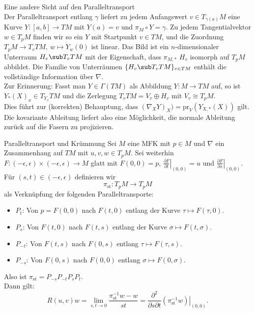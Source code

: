 \begin{bemerkung}Eine andere Sicht auf den Paralleltransport\\
Der Paralleltransport entlang $\gamma$ liefert zu jedem Anfangswert $v \in T_{\gamma(a)}M$ eine Kurve $Y: [a,b] \to TM$ mit $Y(a) = v$ und $\pi_M \circ Y = \gamma$. Zu jedem Tangentialvektor $w \in T_pM$ finden wir so ein $Y$ mit Startpunkt $v \in TM$, und die Zuordnung $T_pM \to T_v TM, \ w \mapsto \dot{Y}_w (0)$ ist linear. Das Bild ist ein $n$-dimensionaler Unterraum $H_v \sub T_v TM$ mit der Eigenschaft, dass $\pi_{M, \ast}$ $H_v$ isomorph auf $T_pM$ abbildet. Die Familie von Unterräumen $\{H_v \sub T_v TM \}_{v \in TM}$ enthält die vollständige Information über $\nabla$.\\
Zur Erinnerung: Fasst man $Y \in \Gamma(TM)$ als Abbildung $Y: M \to TM$ auf, so ist $Y_\ast (X)_x \in T_{Y_x} TM$ und die Zerlegung $T_v TM = V_v \oplus H_v$ mit $V_v \cong T_pM$.\\
Dies führt zur (korrekten) Behauptung, dass $(\nabla_X Y)_X ) = \text{pr}_V (Y_{X, \ast} (X))$ gilt. Die kovariante Ableitung liefert also eine Möglichkeit, die normale Ableitung zurück auf die Fasern zu projizieren.
\end{bemerkung}
\begin{satz}{Paralleltransport und Krümmung}
Sei $M$ eine MFK mit $p \in M$ und $\nabla$ ein Zusammenhang auf $TM$ mit $u,v,w  \in T_pM$. Sei weiterhin $F: (-\epsilon, \epsilon) \times (-\epsilon, \epsilon) \to M$ glatt mit $F(0,0)=p$, $\left.\frac{\partial F}{\partial t}\right|_{(0,0)} = u$ und $\left.\frac{\partial F}{\partial s}\right|_{(0,0)}$. Für $(s,t) \in (- \epsilon, \epsilon)$ definieren wir
\begin{equation}
\pi_\text{st}: T_pM \to T_pM
\end{equation}
als Verknüpfung der folgenden Paralleltransporte:
\begin{itemize}
\item $P_t$: Von $p = F(0,0)$ nach $F(t,0)$ entlang der Kurve $\tau \mapsto F(\tau,0)$.
\item $P_s$: Von $F(t,0)$ nach $F(t,s)$ entlang der Kurve $\sigma \mapsto F(t, \sigma)$.
\item $P_{-t}$: Von $F(t,s)$ nach $F(0,s)$ entlang $\tau \mapsto F(\tau, s)$.
\item $P_{-s}$: Von $F(0,s)$ nach $F(0,0)$ entlang $\sigma \mapsto F(0, \sigma)$.
\end{itemize}
Also ist $\pi_\text{st} = P_{-s}P_{-t}P_sP_t$.\\
Dann gilt:
\begin{equation}
R(u,v)w = \lim_{s,t \to 0} \frac{\pi^{-1}_\text{st}w-w}{st}=\frac{\partial^2}{\partial s \partial t} \left.(\pi^{-1}_\text{st} w)\right|_{(0,0)}.
\end{equation}
\end{satz}
